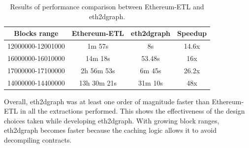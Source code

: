 \begin{table}[H]
\centering
    \begin{threeparttable}
    \begin{tabular}{ c c c c } 
    \toprule
    \textbf{Blocks range} & \textbf{Ethereum-ETL} & \textbf{eth2dgraph} & \textbf{Speedup} \\
    \midrule
    12000000-12001000   & 1m 57s & 8s & 14.6x \\ [1.2ex]  
    16000000-16010000   & 14m 18s & 53.48s & 16x \\ [1.2ex] 
    17000000-17100000   & 2h 56m 53s & 6m 45s & 26.2x \\ [1.2ex]   
    14000000-14400000   & 13h 30m 21s & 31m 10s & 48x \\ [1.2ex]
    \bottomrule
    \end{tabular}
    \end{threeparttable}
    \caption{Results of performance comparison between Ethereum-ETL and eth2dgraph. }
    \label{table:tools-comparison-2}
\end{table}

Overall, eth2dgraph was at least one order of magnitude faster than Ethereum-ETL in all the extractions performed. This shows the effectiveness of the design choices taken while developing eth2dgraph. With growing block ranges, eth2dgraph becomes faster because the caching logic allows it to avoid decompiling contracts.

